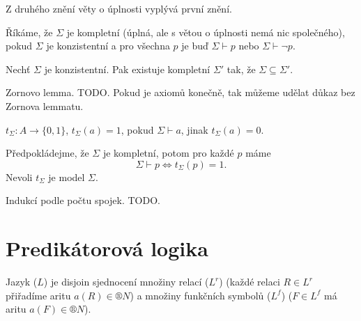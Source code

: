\documentclass[12pt]{article}                   %
\begin{document}
    \begin{dusledek}
        Z druhého znění věty o úplnosti vyplývá první znění.
    \end{dusledek}

    \begin{definice}
        Říkáme, že $\Sigma$ je kompletní (úplná, ale s větou o úplnosti nemá nic společného), pokud $\Sigma$ je konzistentní a pro všechna $p$ je buď $\Sigma \vdash p$ nebo $\Sigma \vdash \neg p$.
    \end{definice}

    \begin{lemma}[Lindenbaum]
        Nechť $\Sigma$ je konzistentní. Pak existuje kompletní $\Sigma'$ tak, že $\Sigma \subseteq \Sigma'$.

        \begin{dukazin}
            Zornovo lemma. TODO. Pokud je axiomů konečně, tak můžeme udělat důkaz bez Zornova lemmatu.
        \end{dukazin}
    \end{lemma}

    \begin{definice}
        $t_\Sigma: A \rightarrow \{0, 1\}$, $t_\Sigma(a) = 1$, pokud $\Sigma \vdash a$, jinak $t_\Sigma(a)= 0$.
    \end{definice}

    \begin{lemma}
        Předpokládejme, že $\Sigma$ je kompletní, potom pro každé $p$ máme
        $$ \Sigma \vdash p \Leftrightarrow t_\Sigma(p) = 1. $$
        Nevoli $t_\Sigma$ je model $\Sigma$.

        \begin{dukazin}
            Indukcí podle počtu spojek. TODO.
        \end{dukazin}
    \end{lemma}


\section{Predikátorová logika}
    \begin{definice}[Jazyk]
        Jazyk ($L$) je disjoin sjednocení množiny relací ($L^r$) (každé relaci $R \in L^r$ přiřadíme aritu $a(R) \in ®N$) a množiny funkčních symbolů ($L^f$) ($F \in L^f$ má aritu $a(F) \in ®N$).
    \end{definice}
\end{document}
